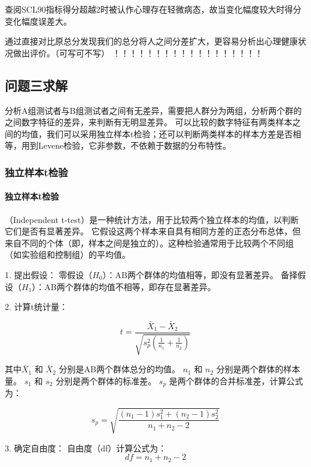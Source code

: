 \documentclass[withoutpreface,bwprint]{cumcmthesis} %
\begin{document}
查阅SCL90指标得分超越2时被认作心理存在轻微病态，故当变化幅度较大时得分变化幅度误差大。

通过直接对比原总分发现我们的总分将人之间分差扩大，更容易分析出心理健康状况做出评价。（可写可不写）
！！！！！！！！！！！！！！！！！！


\subsection{问题三求解}

分析A组测试者与B组测试者之间有无差异，需要把人群分为两组，分析两个群的之间数字特征的差异，来判断有无明显差异。
可以比较的数字特征有两类样本之间的均值，我们可以采用独立样本t检验；还可以判断两类样本的样本方差是否相等，用到Levene检验，它非参数，不依赖于数据的分布特性。

\subsubsection{独立样本t检验}

\paragraph*{独立样本t检验}（Independent t-test）是一种统计方法，用于比较两个独立样本的均值，以判断它们是否有显著差异。
它假设这两个样本来自具有相同方差的正态分布总体，但来自不同的个体（即，样本之间是独立的）。这种检验通常用于比较两个不同组（如实验组和控制组）的平均值。

1. 提出假设：
   零假设（\( H_0 \)）：AB两个群体的均值相等，即没有显著差异。
   备择假设（\( H_1 \)）：AB两个群体的均值不相等，即存在显著差异。

2. 计算t统计量：

\begin{equation}
    t = \frac{\bar{X}_1 - \bar{X}_2}{\sqrt{s_p^2 (\frac{1}{n_1} + \frac{1}{n_2})}}
    \label{eq:t}
\end{equation}

     其中\( \bar{X}_1 \) 和 \( \bar{X}_2 \) 分别是AB两个群体总分的均值。
     \( n_1 \) 和 \( n_2 \) 分别是两个群体的样本量。
     \( s_1 \) 和 \( s_2 \) 分别是两个群体的标准差。
     \( s_p \) 是两个群体的合并标准差，计算公式为：

\begin{equation}
s_p = \sqrt{\frac{(n_1 - 1)s_1^2 + (n_2 - 1)s_2^2}{n_1 + n_2 - 2}}  
    \label{eq:合并标准差}
\end{equation}
     

3. 确定自由度：
   自由度（df）计算公式为：\[ df = n_1 + n_2 - 2 \]
\end{document}
